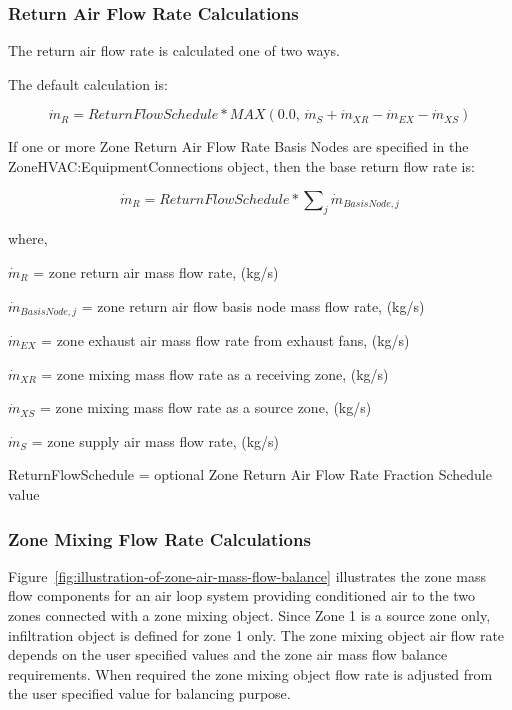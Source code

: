 \subsubsection{Return Air Flow Rate Calculations}\label{return-air-flow-rate-calculations}

The return air flow rate is calculated one of two ways.

The default calculation is:

\begin{equation}
{\dot m_{R}} = ReturnFlowSchedule*MAX\left( {0.0,\,{{\dot m}_S} + {{\dot m}_{XR}} - {{\dot m}_{EX}} - {{\dot m}_{XS}}} \right)
\end{equation}

If one or more Zone Return Air Flow Rate Basis Nodes are specified in the ZoneHVAC:EquipmentConnections object, then the base return flow rate is:

\begin{equation}
{\dot m_{R}} = ReturnFlowSchedule*\sum\nolimits_j {{{\dot m}_{BasisNode,j}}}
\end{equation}

where,

\({\dot m_{R}}\) = zone return air mass flow rate, (kg/s)

\({\dot m_{Basis Node,j}}\) = zone return air flow basis node mass flow rate, (kg/s)

\({\dot m_{EX}}\) = zone exhaust air mass flow rate from exhaust fans, (kg/s)

\({\dot m_{XR}}\) = zone mixing mass flow rate as a receiving zone, (kg/s)

\({\dot m_{XS}}\) = zone mixing mass flow rate as a source zone, (kg/s)

\({\dot m_S}\) = zone supply air mass flow rate, (kg/s)

ReturnFlowSchedule = optional Zone Return Air Flow Rate Fraction Schedule value

\subsubsection{Zone Mixing Flow Rate Calculations}\label{zone-mixing-flow-rate-calculations}

Figure~\ref{fig:illustration-of-zone-air-mass-flow-balance} illustrates the zone mass flow components for an air loop system providing conditioned air to the two zones connected with a zone mixing object. Since Zone 1 is a source zone only, infiltration object is defined for zone 1 only. The zone mixing object air flow rate depends on the user specified values and the zone air mass flow balance requirements. When required the zone mixing object flow rate is adjusted from the user specified value for balancing purpose.

